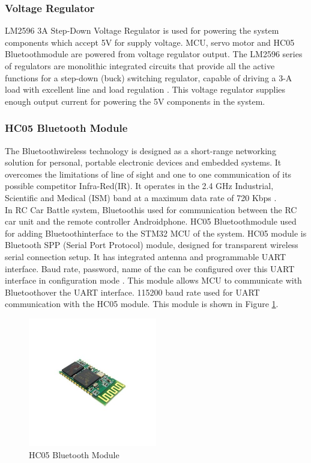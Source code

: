 \subsubsection{Voltage Regulator}
LM2596 3A Step-Down Voltage Regulator is used for powering the system components which accept 5V for supply voltage. MCU, servo motor and HC05 Bluetooth\texttrademark\;module are powered from voltage regulator output. The LM2596 series of regulators are monolithic
integrated circuits that provide all the active functions for a step-down (buck) switching regulator, capable of driving a 3-A load with excellent line and load
regulation \cite{Three}. This voltage regulator supplies enough output current for powering the 5V components in the system.

\subsubsection{HC05 Bluetooth Module}
The Bluetooth\texttrademark\;wireless technology is designed as a short-range networking solution for personal, portable electronic devices and embedded systems. It overcomes the limitations of line of sight and one to one communication of its possible competitor Infra-Red(IR). It operates in the 2.4 GHz Industrial, Scientific and Medical (ISM) band at a maximum data rate of 720 Kbps \cite{Bluetooth_Overview}. \\

In RC Car Battle system, Bluetooth\texttrademark\;is used for communication between the RC car unit and the remote controller Android\texttrademark\;phone. HC05 Bluetooth\texttrademark\;module used for adding Bluetooth\texttrademark\;interface to the STM32 MCU of the system. HC05 module is Bluetooth SPP (Serial Port Protocol) module, designed for transparent wireless serial connection setup. It has integrated antenna and programmable UART interface. Baud rate, password, name of the can be configured over this UART interface in configuration mode \cite{HC05_datasheet}. This module allows MCU to communicate with Bluetooth\texttrademark\;over the UART interface. 115200 baud rate used for UART communication with the HC05 module. This module is shown in Figure \ref{fig:hc05_module}. \\ 

\begin{figure}[!htbp]
    \centering
    \includegraphics[width=0.5\textwidth]{Imgs/400px-HC-05.jpg}
    \caption{\label{fig:hc05_module}HC05 Bluetooth\texttrademark\; Module \cite{HC05_datasheet}}
\end{figure}

